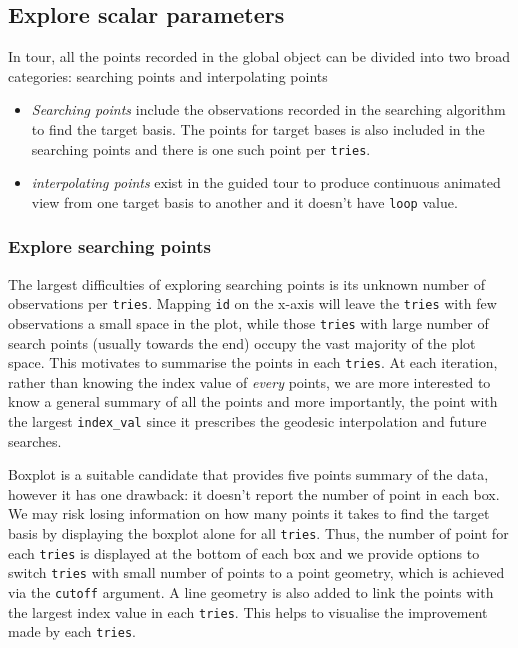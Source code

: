 \documentclass[12pt]{article}
\begin{document}
\hypertarget{explore-scalar-parameters}{%
\subsection{Explore scalar parameters}\label{explore-scalar-parameters}}

In tour, all the points recorded in the global object can be divided
into two broad categories: searching points and interpolating points

\begin{itemize}
\item
  \emph{Searching points} include the observations recorded in the
  searching algorithm to find the target basis. The points for target
  bases is also included in the searching points and there is one such
  point per \texttt{tries}.
\item
  \emph{interpolating points} exist in the guided tour to produce
  continuous animated view from one target basis to another and it
  doesn't have \texttt{loop} value.
\end{itemize}

\hypertarget{explore-searching-points}{%
\subsubsection{Explore searching
points}\label{explore-searching-points}}

The largest difficulties of exploring searching points is its unknown
number of observations per \texttt{tries}. Mapping \texttt{id} on the
x-axis will leave the \texttt{tries} with few observations a small space
in the plot, while those \texttt{tries} with large number of search
points (usually towards the end) occupy the vast majority of the plot
space. This motivates to summarise the points in each \texttt{tries}. At
each iteration, rather than knowing the index value of \emph{every}
points, we are more interested to know a general summary of all the
points and more importantly, the point with the largest
\texttt{index\_val} since it prescribes the geodesic interpolation and
future searches.

Boxplot is a suitable candidate that provides five points summary of the
data, however it has one drawback: it doesn't report the number of point
in each box. We may risk losing information on how many points it takes
to find the target basis by displaying the boxplot alone for all
\texttt{tries}. Thus, the number of point for each \texttt{tries} is
displayed at the bottom of each box and we provide options to switch
\texttt{tries} with small number of points to a point geometry, which is
achieved via the \texttt{cutoff} argument. A line geometry is also added
to link the points with the largest index value in each \texttt{tries}.
This helps to visualise the improvement made by each \texttt{tries}.
\end{document}

